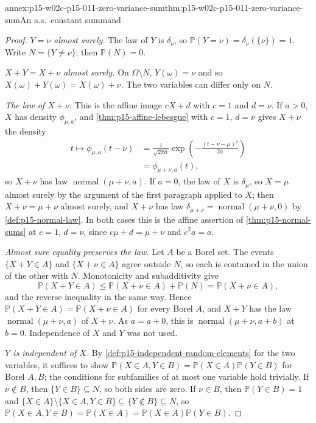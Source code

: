 \begin{annexitem}{annex:p15-w02c-p15-011-zero-variance-sum}{thm:p15-w02c-p15-011-zero-variance-sum}{An a.s.\ constant summand}
\begin{proof}
\emph{\(Y=\nu\) almost surely.} The law of \(Y\) is \(\delta_\nu\), so
\(\mathbb P(Y=\nu)=\delta_\nu(\{\nu\})=1\). Write
\(N=\{Y\neq\nu\}\); then \(\mathbb P(N)=0\).

\emph{\(X+Y=X+\nu\) almost surely.} On \(\Omega\setminus N\),
\(Y(\omega)=\nu\) and so \(X(\omega)+Y(\omega)=X(\omega)+\nu\). The two
variables can differ only on \(N\).

\emph{The law of \(X+\nu\).} This is the affine image \(cX+d\) with \(c=1\)
and \(d=\nu\). If \(a>0\), \(X\) has density \(\phi_{\mu,a}\), and
\cref{thm:p15-affine-lebesgue} with \(c=1\), \(d=\nu\) gives \(X+\nu\) the
density
\[
 \begin{aligned}
 t\longmapsto\phi_{\mu,a}(t-\nu)
  &=\frac1{\sqrt{2\pi a}}\exp\left(-\frac{(t-\nu-\mu)^2}{2a}\right)\\
  &=\phi_{\mu+\nu,a}(t),
 \end{aligned}
\]
so \(X+\nu\) has law \(\operatorname{normal}(\mu+\nu,a)\). If \(a=0\), the
law of \(X\) is \(\delta_\mu\), so \(X=\mu\) almost surely by the argument of
the first paragraph applied to \(X\); then \(X+\nu=\mu+\nu\) almost surely,
and \(X+\nu\) has law \(\delta_{\mu+\nu}=\operatorname{normal}(\mu+\nu,0)\)
by \cref{def:p15-normal-law}. In both cases this is the affine assertion of
\cref{thm:p15-normal-sums} at \(c=1\), \(d=\nu\), since \(c\mu+d=\mu+\nu\)
and \(c^2a=a\).

\emph{Almost sure equality preserves the law.} Let \(A\) be a Borel set.
The events \(\{X+Y\in A\}\) and \(\{X+\nu\in A\}\) agree outside \(N\), so
each is contained in the union of the other with \(N\). Monotonicity and
subadditivity give
\[
 \mathbb P(X+Y\in A)\leq\mathbb P(X+\nu\in A)+\mathbb P(N)
   =\mathbb P(X+\nu\in A),
\]
and the reverse inequality in the same way. Hence
\(\mathbb P(X+Y\in A)=\mathbb P(X+\nu\in A)\) for every Borel \(A\), and
\(X+Y\) has the law \(\operatorname{normal}(\mu+\nu,a)\) of \(X+\nu\). As
\(a=a+0\), this is \(\operatorname{normal}(\mu+\nu,a+b)\) at \(b=0\).
Independence of \(X\) and \(Y\) was not used.

\emph{\(Y\) is independent of \(X\).} By
\cref{def:p15-independent-random-elements} for the two variables, it
suffices to show
\(\mathbb P(X\in A,Y\in B)=\mathbb P(X\in A)\mathbb P(Y\in B)\) for Borel
\(A,B\); the conditions for subfamilies of at most one variable hold
trivially. If \(\nu\notin B\), then \(\{Y\in B\}\subseteq N\), so both sides
are zero. If \(\nu\in B\), then \(\mathbb P(Y\in B)=1\) and
\(\{X\in A\}\setminus\{X\in A,Y\in B\}\subseteq\{Y\notin B\}\subseteq N\),
so \(\mathbb P(X\in A,Y\in B)=\mathbb P(X\in A)
=\mathbb P(X\in A)\mathbb P(Y\in B)\).
\end{proof}
\end{annexitem}

